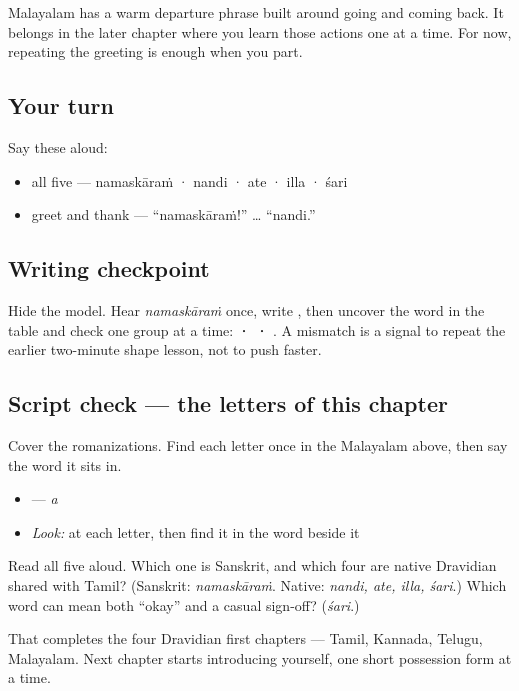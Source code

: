\begin{culture}
Malayalam has a warm departure phrase built around going and coming back. It belongs in the later chapter where you learn those actions one at a time. For now, repeating the greeting is enough when you part.
\end{culture}

\subsection*{Your turn}
Say these aloud:

\begin{itemize}
\raggedright
  \item all five — namaskāraṁ · nandi · ate · illa · śari
  \item greet and thank — \textquotedblleft{}namaskāraṁ!\textquotedblright{} … \textquotedblleft{}nandi.\textquotedblright{}
\end{itemize}

\subsection*{Writing checkpoint}
Hide the model. Hear \emph{namaskāraṁ} once, write \textbf{}, then uncover the word in the table and check one group at a time: \textbf{ ·  · }. A mismatch is a signal to repeat the earlier two-minute shape lesson, not to push faster.

\subsection*{Script check — the letters of this chapter}
Cover the romanizations. Find each letter once in the Malayalam above, then say the word it sits in.

\begin{itemize}
\raggedright
  \item \textbf{} — \textbf{} \emph{a}
\end{itemize}

\begin{itemize}
\raggedright
  \item \emph{Look:} at each letter, then find it in the word beside it
\end{itemize}

\begin{tcolorbox}[breakable,colback=teal!4,colframe=teal!35!black,title={Before you move on}]
Read all five aloud. Which one is Sanskrit, and which four are native Dravidian shared with Tamil? (Sanskrit: \emph{namaskāraṁ}. Native: \emph{nandi, ate, illa, śari}.) Which word can mean both \textquotedblleft{}okay\textquotedblright{} and a casual sign-off? (\emph{śari}.)

That completes the four Dravidian first chapters — Tamil, Kannada, Telugu, Malayalam. Next chapter starts introducing yourself, one short possession form at a time.
\end{tcolorbox}
